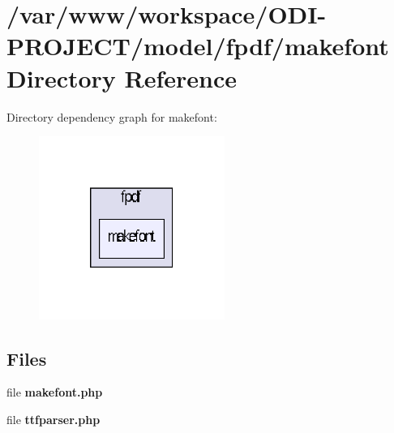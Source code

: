\section{/var/www/workspace/\+O\+D\+I-\/\+P\+R\+O\+J\+E\+C\+T/model/fpdf/makefont Directory Reference}
\label{dir_0e7dfbc14e4bb785cb366afeb0d1928e}
Directory dependency graph for makefont\+:\nopagebreak
\begin{figure}[H]
\begin{center}
\leavevmode
\includegraphics[width=172pt]{dir_0e7dfbc14e4bb785cb366afeb0d1928e_dep}
\end{center}
\end{figure}
\subsection*{Files}
\begin{DoxyCompactItemize}
\item 
file {\bfseries makefont.\+php}
\item 
file {\bfseries ttfparser.\+php}
\end{DoxyCompactItemize}
